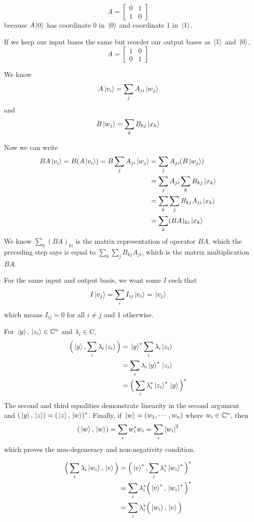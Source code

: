 \exercise
$$A = \begin{bmatrix}
0 & 1 \\
1 & 0
\end{bmatrix}$$ because $A\ket*{0}$ has coordinate 0 in $\ket*{0}$ and coordinate 1 in $\ket*{1}$. 

If we keep our input bases the same but reorder our output bases as $\ket*{1}$ and $\ket*{0}$, 
$$A = \begin{bmatrix}
1 & 0 \\
0 & 1
\end{bmatrix}$$

\exercise 
We know 
$$A \ket*{v_{i}} = \sum_{j} A_{ji} \ket*{w_{j}}$$
and 
$$B \ket*{w_{j}} = \sum_{k} B_{kj} \ket*{x_{k}}$$

Now we can write 
$$
\begin{aligned}
BA \ket*{v_{i}} = B ( A \ket*{v_{i}} ) = B \sum_{j} A_{ji} \ket*{w_{j}} &= \sum_{j} A_{ji} (B \ket*{w_{j}}) \\
&= \sum_{j} A_{ji} \sum_{k} B_{kj} \ket*{x_{k}} \\
&= \sum_{k} \sum_{j} B_{kj} A_{ji} \ket*{x_{k}} \\
&= \sum_{k} (BA)_{ki} \ket*{x_{k}}
\end{aligned}
$$
We know $\sum_{k} (BA)_{ki}$ is the matrix representation of operator $BA$, which the preceding step says is equal to $\sum_{k} \sum_{j} B_{kj} A_{ji}$, which is the matrix multiplication $BA$. 

\exercise 
For the same input and output basis, we want some $I$ such that 
$$I\ket*{v_{j}} = \sum_{i} I_{ij} \ket*{v_{i}} = \ket*{v_{j}}$$
which means $I_{ij} = 0$ for all $i \neq j$ and 1 otherwise. 

\exercise
For $\ket*{y}, \ket*{z_{i}} \in \mathbb{C}^{n}$ and $\lambda_{i} \in C$, 
$$
\begin{aligned}
\Big( \ket*{y}, \sum_{i} \lambda_{i} \ket*{z_{i}} \Big) &= \ket*{y}^{*} \sum_{i} \lambda_{i} \ket*{z_{i}} \\
&= \sum_{i} \lambda_{i} \ket*{y}^{*} \ket*{z_{i}} \\
&= \Big( \sum_{i} \lambda_{i}^{*} \ket*{z_{i}}^{*} \ket*{y} \Big)^{*}
\end{aligned}
$$
The second and third equalities demonstrate linearity in the second argument and $(\ket*{y}, \ket*{z}) = (\ket*{z}, \ket*{w})^{*}$. Finally, if $\ket*{w} = (w_{1}, \cdots, w_{n})$ where $w_{i} \in \mathbb{C}^{n}$, then
$$(\ket*{w}, \ket*{w}) = \sum_{i} w_{i}^{*} w_{i} = \sum_{i} \abs{w_{i}}^{2}$$
which proves the non-degeneracy and non-negativity condition. 

\exercise
$$
\begin{aligned}
\Big( \sum_{i} \lambda_{i} \ket*{w_{i}}, \ket*{v} \Big) &= \Big( \ket*{v}^{*}, \sum_{i} \lambda_{i}^{*} \ket*{w_{i}}^{*} \Big)^{*} \\
&= \sum_{i} \lambda_{i}^{*} \Big( \ket*{v}^{*}, \ket*{w_{i}}^{*} \Big)^{*} \\
&= \sum_{i} \lambda_{i}^{*} \Big( \ket*{w_{i}}, \ket*{v} \Big)
\end{aligned}
$$